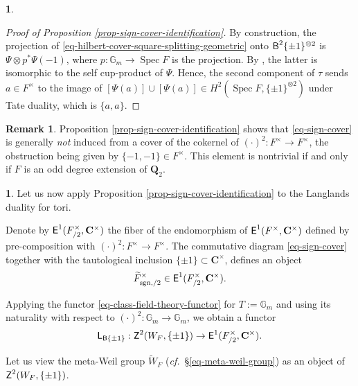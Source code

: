 \documentclass[10pt,english,reqno]{amsart}
\newcommand{\rationals}{\mathbf Q}
\newcommand{\complexes}{\mathbf C}
\newcommand{\cycle}{\textnormal{\textsf{Z}}}
\newcommand{\extension}{\textnormal{\textsf{E}}}
\newcommand{\deloop}{\textnormal{\textsf{B}}}
\newcommand{\Spec}{\operatorname{Spec}}
\newcommand{\sgn}{\mathrm{sgn}}
\newcommand{\Langlands}{\textnormal{\textsf{L}}}
\theoremstyle{definition}
\newtheorem{rem}[subsubsection]{Remark}
\numberwithin{equation}{section}
\newtheorem{untitledsubsubsection}[subsubsection]{}
\newenvironment{void}
{\begin{untitledsubsubsection}}
{\end{untitledsubsubsection}}
\begin{document}
\begin{void}
\begin{proof}[Proof of Proposition \ref{prop-sign-cover-identification}]
By construction, the projection of \eqref{eq-hilbert-cover-square-splitting-geometric} onto $\deloop^2\{\pm 1\}^{\otimes 2}$ is $\Psi\otimes p^*\Psi(-1)$, where $p : \mathbb G_m \rightarrow \Spec F$ is the projection. By \cite[Theorem 3.1.5]{zhao2022metaplectic}, the latter is isomorphic to the self cup-product of $\Psi$. Hence, the second component of $\tau$ sends $a\in F^{\times}$ to the image of $[\Psi(a)] \cup [\Psi(a)] \in H^2(\Spec F, \{\pm 1\}^{\otimes 2})$ under Tate duality, which is $\{a, a\}$.
\end{proof}
\end{void}


\begin{rem}
Proposition \ref{prop-sign-cover-identification} shows that \eqref{eq-sign-cover} is generally \emph{not} induced from a cover of the cokernel of $(\cdot)^2 : F^{\times} \rightarrow F^{\times}$, the obstruction being given by $\{-1, -1\} \in F^{\times}$. This element is nontrivial if and only if $F$ is an odd degree extension of $\rationals_2$.
\end{rem}


\begin{void}
\label{void-sign-cover-meta-weil-group}
Let us now apply Proposition \ref{prop-sign-cover-identification} to the Langlands duality for tori.

Denote by $\extension^1(F^{\times}_{/2}, \complexes^{\times})$ the fiber of the endomorphism of $\extension^1(F^{\times}, \complexes^{\times})$ defined by pre-composition with $(\cdot)^2 : F^{\times} \rightarrow F^{\times}$. The commutative diagram \eqref{eq-sign-cover} together with the tautological inclusion $\{\pm 1\} \subset \complexes^{\times}$, defines an object
$$
\widetilde F^{\times}_{\sgn, /2} \in \extension^1(F^{\times}_{/2}, \complexes^{\times}).
$$

Applying the functor \eqref{eq-class-field-theory-functor} for $T := \mathbb G_m$ and using its naturality with respect to $(\cdot)^2 : \mathbb G_m \rightarrow \mathbb G_m$, we obtain a functor
$$
\Langlands_{\deloop\{\pm 1\}} : \cycle^2(W_F, \{\pm 1\}) \rightarrow \extension^1(F^{\times}_{/2}, \complexes^{\times}).
$$

Let us view the meta-Weil group $\widetilde W_F$ (\emph{cf.}~\S\ref{eq-meta-weil-group}) as an object of $\cycle^2(W_F, \{\pm 1\})$.
\end{void}

\end{document}
